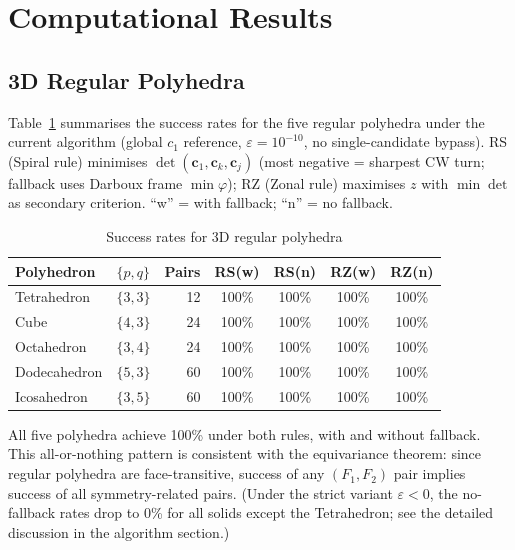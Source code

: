 \documentclass[12pt,a4paper]{article}
\theoremstyle{definition}
\begin{document}
\section{Computational Results}

\subsection{3D Regular Polyhedra}
\label{ssec:res3dplatonic}

Table~\ref{tab:res3dplatonic} summarises the success rates for the five
regular polyhedra under the current algorithm (global $c_1$ reference,
$\varepsilon = 10^{-10}$, no single-candidate bypass).
RS (Spiral rule) minimises $\det(\mathbf{c}_1,\mathbf{c}_k,\mathbf{c}_j)$
(most negative = sharpest CW turn; fallback uses Darboux frame $\min\varphi$);
RZ (Zonal rule) maximises $z$ with $\min\det$ as secondary criterion.
``w'' = with fallback; ``n'' = no fallback.

\begin{table}[h]
\centering
\caption{Success rates for 3D regular polyhedra}
\label{tab:res3dplatonic}
\begin{tabular}{llrcccc}
\toprule
Polyhedron & $\{p,q\}$ & Pairs & RS(w) & RS(n) & RZ(w) & RZ(n) \\
\midrule
Tetrahedron  & $\{3,3\}$ & 12 & 100\% & 100\% & 100\% & 100\% \\
Cube         & $\{4,3\}$ & 24 & 100\% & 100\% & 100\% & 100\% \\
Octahedron   & $\{3,4\}$ & 24 & 100\% & 100\% & 100\% & 100\% \\
Dodecahedron & $\{5,3\}$ & 60 & 100\% & 100\% & 100\% & 100\% \\
Icosahedron  & $\{3,5\}$ & 60 & 100\% & 100\% & 100\% & 100\% \\
\bottomrule
\end{tabular}
\end{table}

\noindent
All five polyhedra achieve 100\% under both rules, with and without
fallback.
This all-or-nothing pattern is consistent with the equivariance theorem:
since regular polyhedra are face-transitive, success of any $(F_1,F_2)$
pair implies success of all symmetry-related pairs.
(Under the strict variant $\varepsilon<0$, the no-fallback rates drop to
0\% for all solids except the Tetrahedron; see the detailed discussion
in the algorithm section.)
\end{document}
